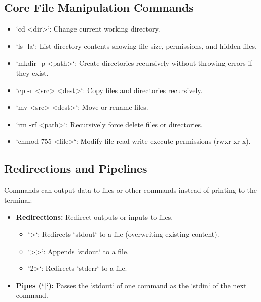 \documentclass[12pt,a4paper]{article}
\begin{document}
\subsection{Core File Manipulation Commands}
\begin{itemize}[leftmargin=*, itemsep=3pt]
  \item `cd <dir>`: Change current working directory.
  \item `ls -la`: List directory contents showing file size, permissions, and hidden files.
  \item `mkdir -p <path>`: Create directories recursively without throwing errors if they exist.
  \item `cp -r <src> <dest>`: Copy files and directories recursively.
  \item `mv <src> <dest>`: Move or rename files.
  \item `rm -rf <path>`: Recursively force delete files or directories.
  \item `chmod 755 <file>`: Modify file read-write-execute permissions (rwxr-xr-x).
\end{itemize}

\subsection{Redirections and Pipelines}
Commands can output data to files or other commands instead of printing to the terminal:
\begin{itemize}[leftmargin=*, itemsep=3pt]
  \item \textbf{Redirections:} Redirect outputs or inputs to files.
        \begin{itemize}[leftmargin=*, noitemsep]
          \item `>`: Redirects `stdout` to a file (overwriting existing content).
          \item `>>`: Appends `stdout` to a file.
          \item `2>`: Redirects `stderr` to a file.
        \end{itemize}
  \item \textbf{Pipes (`|`):} Passes the `stdout` of one command as the `stdin` of the next command.
\end{itemize}
\end{document}
